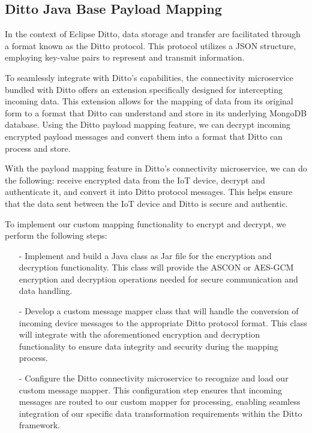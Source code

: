 
\subsection{Ditto Java Base Payload Mapping}

In the context of Eclipse Ditto, data storage and transfer are facilitated through a format known as the Ditto protocol. This protocol utilizes a JSON structure, employing key-value pairs to represent and transmit information.

To seamlessly integrate with Ditto's capabilities, the connectivity microservice bundled with Ditto offers an extension specifically designed for intercepting incoming data. This extension allows for the mapping of data from its original form to a format that Ditto can understand and store in its underlying MongoDB database. Using the Ditto payload mapping feature, we can decrypt incoming encrypted payload messages and convert them into a format that Ditto can process and store.
 
With the payload mapping feature in Ditto's connectivity microservice, we can do the following: receive encrypted data from the IoT device, decrypt and authenticate it, and convert it into Ditto protocol messages. This helps ensure that the data sent between the IoT device and Ditto is secure and authentic.

To implement our custom mapping functionality to encrypt and decrypt, we perform the following steps:
\begin{itemize}
    \item[-] Implement and build a Java class as Jar file for the encryption and decryption functionality. This class will provide the ASCON or AES-GCM encryption and decryption operations needed for secure communication and data handling. 
    \item[-] Develop a custom message mapper class that will handle the conversion of incoming device messages to the appropriate Ditto protocol format. This class will integrate with the aforementioned encryption and decryption functionality to ensure data integrity and security during the mapping process.
    \item[-]Configure the Ditto connectivity microservice to recognize and load our custom message mapper. This configuration step ensures that incoming messages are routed to our custom mapper for processing, enabling seamless integration of our specific data transformation requirements within the Ditto framework.
\end{itemize}








